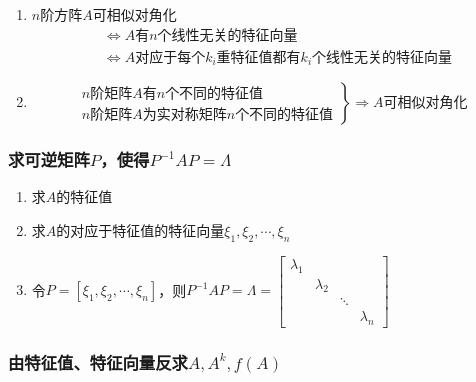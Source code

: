 \documentclass[./linear_algebra.tex]{subfiles}
\begin{document}
    \begin{enumerate}
        \item $n$阶方阵$A$可相似对角化
        \begin{align*}
            &\Leftrightarrow A\text{有}n\text{个线性无关的特征向量} \\
            &\Leftrightarrow A\text{对应于每个}k_i\text{重特征值都有}k_i\text{个线性无关的特征向量}
        \end{align*}
        \item
        \[
            \left.
                \begin{aligned}
                    n\text{阶矩阵}A\text{有}n\text{个不同的特征值} \\
                    n\text{阶矩阵}A\text{为实对称矩阵}n\text{个不同的特征值}
                \end{aligned}
            \right\}\Rightarrow A\text{可相似对角化}
        \]
    \end{enumerate}

    \subsubsection{求可逆矩阵$P$，使得$P^{-1}AP = \Lambda$}

    \begin{enumerate}
        \item 求$A$的特征值
        \item 求$A$的对应于特征值的特征向量$\xi_1, \xi_2, \cdots, \xi_n$
        \item 令$P = [\xi_1, \xi_2, \cdots, \xi_n]$，则$P^{-1}AP = \Lambda = \begin{bmatrix}
                                                                                \lambda_1 &           &        &           \\
                                                                                & \lambda_2 &        &           \\
                                                                                &           & \ddots &           \\
                                                                                &           &        & \lambda_n
        \end{bmatrix}$
    \end{enumerate}

    \subsubsection{由特征值、特征向量反求$A, A^k, f(A)$}
\end{document}
